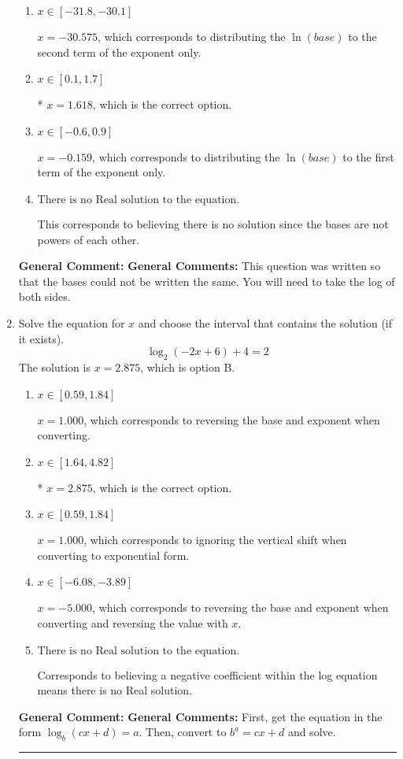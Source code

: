 \documentclass{extbook}[14pt]
\newcommand{\litem}[1]{\item #1

\rule{\textwidth}{0.4pt}}
\begin{document}
\begin{enumerate}
{\begin{enumerate}[label=\Alph*.]
$x = 3.000$, which corresponds to solving the numerators as equal while ignoring the bases are different.
\item \( x \in [-31.8, -30.1] \)

$x = -30.575$, which corresponds to distributing the $\ln(base)$ to the second term of the exponent only.
\item \( x \in [0.1, 1.7] \)

* $x = 1.618$, which is the correct option.
\item \( x \in [-0.6, 0.9] \)

$x = -0.159$, which corresponds to distributing the $\ln(base)$ to the first term of the exponent only.
\item \( \text{There is no Real solution to the equation.} \)

This corresponds to believing there is no solution since the bases are not powers of each other.
\end{enumerate}

\textbf{General Comment:} \textbf{General Comments:} This question was written so that the bases could not be written the same. You will need to take the log of both sides.
}
\litem{
Solve the equation for $x$ and choose the interval that contains the solution (if it exists).
\[ \log_{2}{(-2x+6)}+4 = 2 \]The solution is \( x = 2.875 \), which is option B.\begin{enumerate}[label=\Alph*.]
\item \( x \in [0.59, 1.84] \)

$x = 1.000$, which corresponds to reversing the base and exponent when converting.
\item \( x \in [1.64, 4.82] \)

* $x = 2.875$, which is the correct option.
\item \( x \in [0.59, 1.84] \)

$x = 1.000$, which corresponds to ignoring the vertical shift when converting to exponential form.
\item \( x \in [-6.08, -3.89] \)

$x = -5.000$, which corresponds to reversing the base and exponent when converting and reversing the value with $x$.
\item \( \text{There is no Real solution to the equation.} \)

Corresponds to believing a negative coefficient within the log equation means there is no Real solution.
\end{enumerate}

\textbf{General Comment:} \textbf{General Comments:} First, get the equation in the form $\log_b{(cx+d)} = a$. Then, convert to $b^a = cx+d$ and solve.
}
\end{enumerate}
\end{document}
